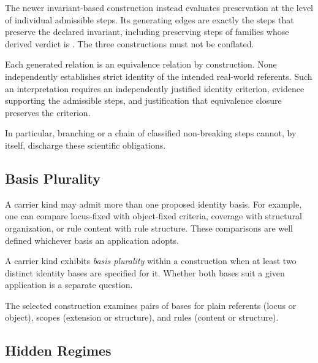 The newer invariant-based construction instead evaluates
preservation at the level of individual admissible steps.
Its generating edges are exactly the steps that preserve
the declared invariant, including preserving steps of
families whose derived verdict is \MIX{}.
The three constructions must not be conflated.

Each generated relation is an equivalence relation by construction.
None independently establishes strict identity of the intended
real-world referents.
Such an interpretation requires an independently justified
identity criterion, evidence supporting the admissible steps,
and justification that equivalence closure preserves the criterion.

In particular, branching or a chain of classified non-breaking
steps cannot, by itself, discharge these scientific obligations.

\subsection{Basis Plurality}
\label{subsec:basis_plurality}

A carrier kind may admit more than one proposed identity basis.
For example, one can compare locus-fixed with object-fixed criteria,
coverage with structural organization, or rule content with rule structure.
These comparisons are well defined whichever basis an application adopts.

\begin{definition}
  \label{se200.def.BasisPlurality}
  A carrier kind exhibits \emph{basis plurality} within a construction
  when at least two distinct identity bases are specified for it.
  Whether both bases suit a given application is a separate question.
\end{definition}

The selected construction examines pairs of bases for plain referents
(locus or object), scopes (extension or structure), and rules
(content or structure).

\subsection{Hidden Regimes}
\label{subsec:hidden_regimes}

